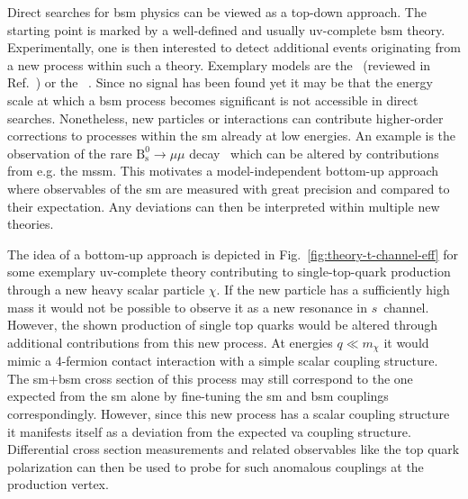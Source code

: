 Direct searches for \gls{bsm} physics can be viewed as a top-down approach. The starting point is marked by a well-defined and usually \gls{uv}-complete \gls{bsm} theory. Experimentally, one is then interested to detect additional events originating from a new process within such a theory. Exemplary models are the ~(reviewed in Ref.~\cite{Csaki:1996ks}) or the ~\cite{Branco:2011iw}. Since no signal has been found yet it may be that the energy scale at which a \gls{bsm} process becomes significant is not accessible in direct searches. Nonetheless, new particles or interactions can contribute higher-order corrections to processes within the \gls{sm} already at low energies. An example is the observation of the rare $\mathrm{B}^{0}_\mathrm{s}\to\mu\mu$ decay~\cite{CMS:2014xfa} which can be altered by contributions from e.g. the \gls{mssm}. This motivates a model-independent bottom-up approach where observables of the \gls{sm} are measured with great precision and compared to their expectation. Any deviations can then be interpreted within multiple new theories.

The idea of a bottom-up approach is depicted in Fig.~\ref{fig:theory-t-channel-eff} for some exemplary \gls{uv}-complete theory contributing to single-top-quark production through a new heavy scalar particle $\chi$. If the new particle has a sufficiently high mass it would not be possible to observe it as a new resonance in $s$~channel. However, the shown production of single top quarks would be altered through additional contributions from this new process. At energies $q\ll m_{\chi}$ it would mimic a 4-fermion contact interaction with a simple scalar coupling structure. The \mbox{\gls{sm}+\gls{bsm}} cross section of this process may still correspond to the one expected from the \gls{sm} alone by fine-tuning the \gls{sm} and \gls{bsm} couplings correspondingly. However, since this new process has a scalar coupling structure it manifests itself as a deviation from the expected \gls{va} coupling structure. Differential cross section measurements and related observables like the top quark polarization can then be used to probe for such anomalous couplings at the production vertex.

